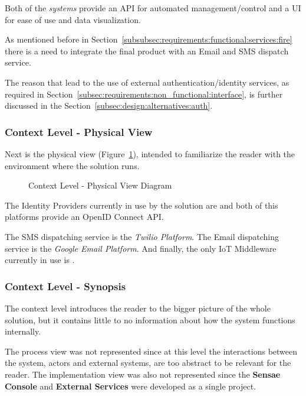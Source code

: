 Both of the \textit{systems} provide an \gls{API} for automated management/control and a \gls{UI} for ease of use and data visualization.

As mentioned before in Section~\ref{subsubsec:requirements:functional:services:fire} there is a need to integrate the final product with an Email and SMS dispatch service.

The reason that lead to the use of external authentication/identity services, as required in Section~\ref{subsec:requirements:non_functional:interface}, is further discussed in the Section~\ref{subsec:design:alternatives:auth}.

\subsubsection{Context Level - Physical View}
\label{subsubsec:design:architecture:context:physical}

Next is the physical view (Figure~\ref{fig:design:architecture:context:physical:diagram}), intended to familiarize the reader with the environment where the solution runs.

\begin{figure}[H]
   \centering
   \resizebox{\columnwidth}{!}
   {
      
   }
   \caption[Context Level - Physical View Diagram]{Context Level - Physical View Diagram}
   \label{fig:design:architecture:context:physical:diagram}
\end{figure}

The Identity Providers currently in use by the solution are \cite{googleid} and \cite{azureid} both of this platforms provide an OpenID Connect \gls{API}.

The SMS dispatching service is the \textit{Twilio Platform}. The Email dispatching service is the \textit{Google Email Platform}. And finally, the only \gls{IoT} Middleware currently in use is \cite{helium}.

\subsubsection{Context Level - Synopsis}
\label{subsubsec:design:architecture:context:synopsis}

The context level introduces the reader to the bigger picture of the whole solution, but it contains little to no information about how the system functions internally.

The process view was not represented since at this level the interactions between the system, actors and external systems, are too abstract to be relevant for the reader.
The implementation view was also not represented since the \textbf{Sensae Console} and \textbf{External Services} were developed as a single project.

